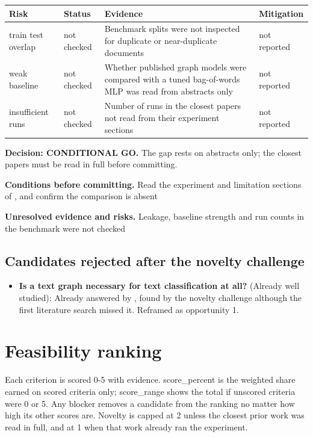 \documentclass[11pt,a4paper]{article}
\begin{document}
{\small
\begin{longtable}{>{\raggedright\arraybackslash}p{}>{\raggedright\arraybackslash}p{}>{\raggedright\arraybackslash}p{}>{\raggedright\arraybackslash}p{}}
\toprule
\textbf{Risk} & \textbf{Status} & \textbf{Evidence} & \textbf{Mitigation} \\
\midrule
\endhead
train test overlap & not checked & Benchmark splits were not inspected for duplicate or near-duplicate documents & not reported \\
weak baseline & not checked & Whether published graph models were compared with a tuned bag-of-words MLP was read from abstracts only & not reported \\
insufficient runs & not checked & Number of runs in the closest papers not read from their experiment sections & not reported \\
\bottomrule
\end{longtable}
}

\textbf{Decision: CONDITIONAL GO.} The gap rests on abstracts only; the closest papers must be read in full before committing.

\textbf{Conditions before committing.} Read the experiment and limitation sections of \cite{ghosh2022}, \cite{galke2022} and confirm the comparison is absent

\textbf{Unresolved evidence and risks.} Leakage, baseline strength and run counts in the benchmark were not checked

\subsection{Candidates rejected after the novelty challenge}

\begin{itemize}
\item \textbf{Is a text graph necessary for text classification at all?} (Already well studied): Already answered by \cite{galke2022}, found by the novelty challenge although the first literature search missed it. Reframed as opportunity 1.
\end{itemize}

\section{Feasibility ranking}

Each criterion is scored 0-5 with evidence. score\_percent is the weighted share earned on scored criteria only; score\_range shows the total if unscored criteria were 0 or 5. Any blocker removes a candidate from the ranking no matter how high its other scores are. Novelty is capped at 2 unless the closest prior work was read in full, and at 1 when that work already ran the experiment.
\end{document}
